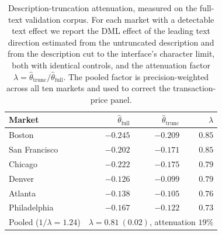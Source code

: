 \begin{table}[H]
\centering
\caption{Description-truncation attenuation, measured on the full-text validation
corpus. For each market with a detectable text effect we report the DML effect of
the leading text direction estimated from the untruncated description and from the
description cut to the interface's character limit, both with identical controls,
and the attenuation factor $\lambda=\hat\theta_{\text{trunc}}/\hat\theta_{\text{full}}$.
The pooled factor is precision-weighted across all ten markets and used to correct
the transaction-price panel.}
\label{tab:truncation}
\small
\begin{tabular}{lrrr}
\toprule
Market & $\hat\theta_{\text{full}}$ & $\hat\theta_{\text{trunc}}$ & $\lambda$ \\
\midrule
Boston       & $-0.245$ & $-0.209$ & $0.85$ \\
San Francisco& $-0.202$ & $-0.171$ & $0.85$ \\
Chicago      & $-0.222$ & $-0.175$ & $0.79$ \\
Denver       & $-0.126$ & $-0.099$ & $0.79$ \\
Atlanta      & $-0.138$ & $-0.105$ & $0.76$ \\
Philadelphia & $-0.167$ & $-0.122$ & $0.73$ \\
\midrule
Pooled ($1/\lambda=1.24$) & \multicolumn{3}{r}{$\lambda=0.81\ (0.02)$, attenuation $19\%$} \\
\bottomrule
\end{tabular}
\end{table}
